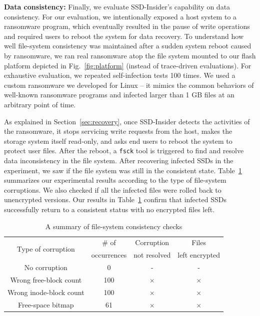 \documentclass[conference]{IEEEtran}
\newcommand{\ours}{SSD-Insider}
\begin{document}
{\bf Data consistency:} 
Finally, we evaluate \ours{}'s capability on data consistency.  For
our evaluation, we intentionally exposed a host system to a
ransomware program, which eventually resulted in the pause of write
operations and required users to reboot the system for data
recovery.  To understand how well file-system consistency was
maintained after a sudden system reboot caused by ransomware,  we
ran real ransomware atop the file system mounted to our flash
platform depicted in Fig.~\ref{fig:platform} (instead of
trace-driven evaluations).  For exhaustive evaluation, we repeated
self-infection tests 100 times.  We used a custom ransomware we
developed for Linux -- it mimics the common behaviors of well-known
ransomware programs and infected larger than 1 GB files at an
arbitrary point of time.

As explained in Section~\ref{sec:recovery}, once \ours{} detects
the activities of the ransomware, it stops servicing write requests
from the host, makes the storage system itself read-only, and asks
end users to reboot the system to protect user files.  After the
reboot, a \texttt{fsck} tool is triggered to find and resolve data
inconsistency in the file system. After recovering infected SSDs in
the experiment, we saw if the file system was still in the
consistent state.  Table~\ref{tab:flash-consist} summarizes our
experimental results according to the type of file-system
corruptions. We also checked if all the infected files were rolled
back to unencrypted versions. Our results in
Table~\ref{tab:flash-consist} confirm that infected SSDs
successfully return to a consistent status with no encrypted files
left.

\begin{table}[t]
	\centering
	\caption{A summary of file-system consistency checks}
	\begin{tabular}{c|c|c|c}
		\hline
		\multirow{2}{*}{Type of corruption}   & \# of 			& 	Corruption 		& Files \\
											  & occurrences 	&   not resolved	& left encrypted \\
		\hline
		\hline
		No corruption			& 0  			& -  	     & - \\ 
		Wrong free-block count 	& 100 & $\times$ & $\times$ \\ 
		Wrong inode-block count & 100 & $\times$ & $\times$ \\ 
		Free-space bitmap		& 61  & $\times$ & $\times$ \\ 
		\hline
	\end{tabular}
	\label{tab:flash-consist}
\end{table}
\end{document}
